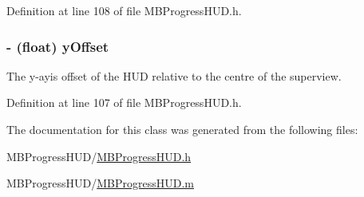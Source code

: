 Definition at line 108 of file MBProgressHUD.h.

\hypertarget{interface_m_b_progress_h_u_d_a5193d79f9884fd5dad21aa7981429d16}{
\subsubsection[{yOffset}]{\setlength{\rightskip}{0pt plus 5cm}-\/ (float) yOffset}}
\label{interface_m_b_progress_h_u_d_a5193d79f9884fd5dad21aa7981429d16}
The y-\/ayis offset of the HUD relative to the centre of the superview. 

Definition at line 107 of file MBProgressHUD.h.



The documentation for this class was generated from the following files:\begin{DoxyCompactItemize}
\item 
MBProgressHUD/\hyperlink{_m_b_progress_h_u_d_8h}{MBProgressHUD.h}\item 
MBProgressHUD/\hyperlink{_m_b_progress_h_u_d_8m}{MBProgressHUD.m}\end{DoxyCompactItemize}
